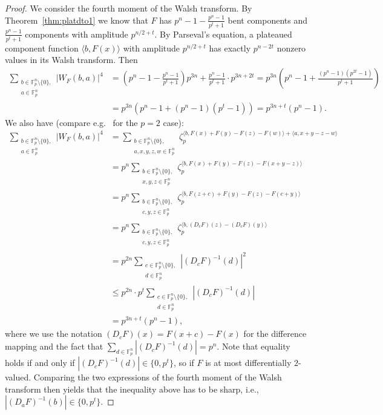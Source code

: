\documentclass[11pt]{article}
\newcommand{\F}{\mathbb F}
\theoremstyle{plain}
\theoremstyle{definition}
\numberwithin{theorem}{section}
\numberwithin{equation}{section}
\numberwithin{table}{section}
\numberwithin{figure}{section}
\begin{document}
{\begin{proof}
    We consider the fourth moment of the Walsh transform. By Theorem~\ref{thm:platdto1} we know that $F$ has $p^n-1-\frac{p^n-1}{p^t+1}$ bent components and $\frac{p^n-1}{p^t+1}$ components with amplitude $p^{n/2+t}$. By Parseval's equation, a plateaued component function $\langle b,F(x) \rangle$ with amplitude $p^{n/2+t}$ has exactly $p^{n-2t}$ nonzero values in its Walsh transform. Then
    \begin{align*}
         \sum_{\substack{b \in \F_p^n\setminus\{0\},\\a \in \F_p^n}}|W_F(b,a)|^4 &= \left(p^n-1-\frac{p^n-1}{p^t+1}\right)p^{3n}+\frac{p^n-1}{p^t+1}\cdot p^{3n+2t}=p^{3n}\left(p^n-1+\frac{(p^n-1)(p^{2t}-1)}{p^t+1}\right)\\&=p^{3n}(p^n-1+(p^n-1)(p^t-1))=p^{3n+t}(p^n-1).
    \end{align*}
      We also have (compare e.g.~\cite[Lemma 1]{charpin2019new} for the $p=2$ case):
    \begin{align}
        \sum_{\substack{b \in \F_p^n\setminus\{0\},\\a \in \F_p^n}} |W_F(b,a)|^4 
        &=\sum_{\substack{b \in \F_p^n\setminus\{0\},\\a,x,y,z,w \in \F_p^n}}\zeta_p^{\langle b,F(x)+F(y)-F(z)-F(w) \rangle + \langle a,x+y-z-w \rangle}\nonumber\\
        &=p^n \sum_{\substack{b \in \F_p^n\setminus\{0\},\\x,y,z \in \F_p^n}} \zeta_p^{\langle b,F(x)+F(y)-F(z)-F(x+y-z) \rangle}\nonumber\\
        &=p^n \sum_{\substack{b \in \F_p^n\setminus\{0\},\\c,y,z \in \F_p^n}} \zeta_p^{\langle b,F(z+c)+F(y)-F(z)-F(c+y) \rangle}\nonumber\\
       &=p^n \sum_{\substack{b \in \F_p^n\setminus\{0\},\\c,y,z \in \F_p^n}} \zeta_p^{\langle b,(D_cF)(z)-(D_cF)(y) \rangle}\nonumber\\
        &=p^{2n}\sum_{\substack{c \in \F_p^n\setminus\{0\},\\d \in \F_p^n}}|(D_cF)^{-1}(d)|^2 \nonumber\\ 
        &\leq p^{2n}\cdot p^t\sum_{\substack{c \in \F_p^n\setminus\{0\},\\d \in \F_p^n}}  |(D_cF)^{-1}(d)|\nonumber \\
        &=p^{3n+t}(p^n-1),\label{eq:interm}
    \end{align}
        where we use the notation $(D_cF)(x)=F(x+c)-F(x)$ for the difference mapping and the fact that $\sum_{d \in \F_{p}^n}|(D_cF)^{-1}(d)|=p^n$. Note that equality holds if and only if $|(D_cF)^{-1}(d)| \in \{0,p^t\}$, so if $F$ is at most differentially $2$-valued. Comparing the two expressions of the fourth moment of the Walsh transform then yields that the inequality above has to be sharp, i.e., $|(D_aF)^{-1}(b)| \in \{0,p^t\}$.
\end{proof}

}
\end{document}
